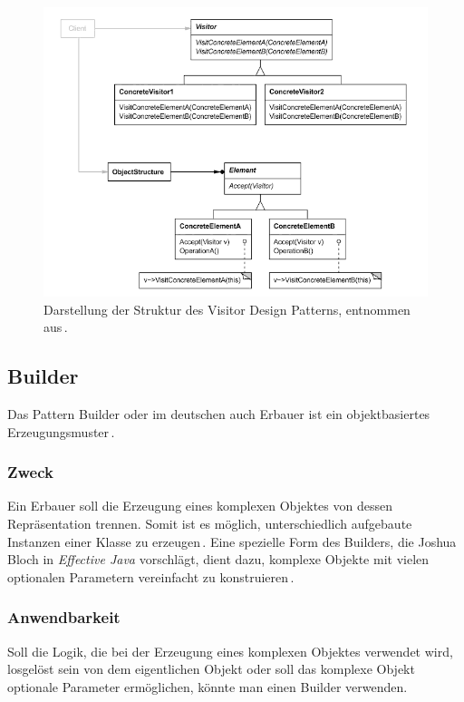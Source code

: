 \documentclass[12pt,oneside,a4paper,parskip]{scrbook}
\begin{document}
\begin{figure}[htbp]
\centering
\includegraphics[width=1.0\textwidth]{bilder/visitor}
\caption{Darstellung der Struktur des Visitor Design Patterns, entnommen aus\,\cite[S. 485]{gamma2015}.}
\label{fig:visitor}
\end{figure}

\subsection{Builder}

Das Pattern Builder oder im deutschen auch Erbauer ist ein objektbasiertes Erzeugungsmuster\,\cite[S. 159]{gamma2015}.

\subsubsection{Zweck}

Ein Erbauer soll die Erzeugung eines komplexen Objektes von dessen Repräsentation trennen. Somit ist es möglich, unterschiedlich aufgebaute Instanzen einer Klasse zu erzeugen\,\cite[S. 159]{gamma2015}. Eine spezielle Form des Builders, die Joshua Bloch in \textit{Effective Java} vorschlägt, dient dazu, komplexe Objekte mit vielen optionalen Parametern vereinfacht zu konstruieren\,\cite[S. 10ff.]{bloch2017}.

\subsubsection{Anwendbarkeit}

Soll die Logik, die bei der Erzeugung eines komplexen Objektes verwendet wird, losgelöst sein von dem eigentlichen Objekt oder soll das komplexe Objekt optionale Parameter ermöglichen, könnte man einen Builder verwenden.
\end{document}
